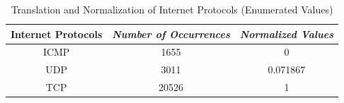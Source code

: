 \documentclass[conference]{llncs}
\begin{document}

\begin{table}
\caption{Translation and Normalization of Internet Protocols (Enumerated Values)}
\begin{center}
\begin{tabular}{|c|c|c|}
\hline
\multicolumn{1}{|p{2cm}|}{\centering \textbf{Internet Protocols}} & \multicolumn{1}{|p{2cm}|}{\centering \textbf{\textit{Number of Occurrences}}} & \multicolumn{1}{|p{2cm}|}{\centering \textbf{\textit{Normalized Values}}}\\
\hline
ICMP & 1655 & 0\\
UDP & 3011 & 0.071867 \\
TCP & 20526 & 1 \\
\hline
\end{tabular}
\label{tab3}
\end{center}
\end{table}
\end{document}
